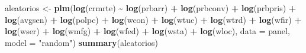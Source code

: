 \documentclass[
  12pt,
]{article}
\newenvironment{Shaded}{\begin{snugshade}}{\end{snugshade}}
\newcommand{\AttributeTok}[1]{\textcolor[rgb]{0.13,0.29,0.53}{#1}}
\newcommand{\FunctionTok}[1]{\textcolor[rgb]{0.13,0.29,0.53}{\textbf{#1}}}
\newcommand{\NormalTok}[1]{#1}
\newcommand{\OtherTok}[1]{\textcolor[rgb]{0.56,0.35,0.01}{#1}}
\newcommand{\SpecialCharTok}[1]{\textcolor[rgb]{0.81,0.36,0.00}{\textbf{#1}}}
\newcommand{\StringTok}[1]{\textcolor[rgb]{0.31,0.60,0.02}{#1}}
\begin{document}
\begin{Shaded}
\begin{Highlighting}[]
\NormalTok{aleatorios }\OtherTok{\textless{}{-}} \FunctionTok{plm}\NormalTok{(}\FunctionTok{log}\NormalTok{(crmrte) }\SpecialCharTok{\textasciitilde{}} \FunctionTok{log}\NormalTok{(prbarr) }\SpecialCharTok{+} \FunctionTok{log}\NormalTok{(prbconv) }\SpecialCharTok{+} \FunctionTok{log}\NormalTok{(prbpris)  }\SpecialCharTok{+} 
                    \FunctionTok{log}\NormalTok{(avgsen) }\SpecialCharTok{+} \FunctionTok{log}\NormalTok{(polpc) }\SpecialCharTok{+} \FunctionTok{log}\NormalTok{(wcon) }\SpecialCharTok{+} \FunctionTok{log}\NormalTok{(wtuc) }\SpecialCharTok{+} 
                    \FunctionTok{log}\NormalTok{(wtrd) }\SpecialCharTok{+} \FunctionTok{log}\NormalTok{(wfir) }\SpecialCharTok{+} \FunctionTok{log}\NormalTok{(wser) }\SpecialCharTok{+} \FunctionTok{log}\NormalTok{(wmfg) }\SpecialCharTok{+} \FunctionTok{log}\NormalTok{(wfed) }\SpecialCharTok{+} 
                    \FunctionTok{log}\NormalTok{(wsta) }\SpecialCharTok{+} \FunctionTok{log}\NormalTok{(wloc), }\AttributeTok{data =}\NormalTok{ panel, }\AttributeTok{model =} \StringTok{"random"}\NormalTok{)}
\FunctionTok{summary}\NormalTok{(aleatorios)}
\end{Highlighting}
\end{Shaded}
\end{document}
